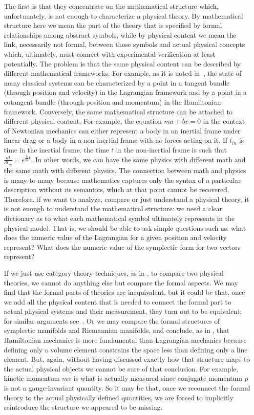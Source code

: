 \documentclass[11pt]{elsarticle}
\begin{document}
The first is that they concentrate on the mathematical structure which, unfortunately, is not enough to characterize a physical theory. By mathematical structure here we mean the part of the theory that is specified by formal relationships among abstract symbols, while by physical content we mean the link, necessarily not formal, between those symbols and actual physical concepts which, ultimately, must connect with experimental verification at least potentially. The problem is that the same physical content can be described by different mathematical frameworks. For example, as it is noted in~\cite{North,Curiel,Barrett1,Barrett2}, the state of many classical systems can be characterized by a point in a tangent bundle (through position and velocity) in the Lagrangian framework and by a point in a cotangent bundle (through position and momentum) in the Hamiltonian framework. Conversely, the same mathematical structure can be attached to different physical content. For example, the equation $ma + bv = 0$ in the context of Newtonian mechanics can either represent a body in an inertial frame under linear drag or a body in a non-inertial frame with no forces acting on it. If $t_{in}$ is time in the inertial frame, the time $t$ in the non-inertial frame is such that  $\frac{dt}{dt_{in}} = e^{\frac{b}{m}t}$. In other words, we can have the same physics with different math and the same math with different physics. The connection between math and physics is many-to-many because mathematics captures only the syntax of a particular description without its semantics, which at that point cannot be recovered. Therefore, if we want to analyze, compare or just understand a physical theory, it is not enough to understand the mathematical structure: we need a clear dictionary as to what each mathematical symbol ultimately represents in the physical model. That is, we should be able to ask simple questions such as: what does the numeric value of the Lagrangian for a given position and velocity represent? What does the numeric value of the symplectic form for two vectors represent?

If we just use category theory techniques, as in \cite{Barrett2}, to compare two physical theories, we cannot do anything else but compare the formal aspects. We may find that the formal parts of theories are inequivalent, but it could be that, once we add all the physical content that is needed to connect the formal part to actual physical systems and their measurement, they turn out to be equivalent; for similar arguments see~\cite{Coffey}. Or we may compare the formal structures of symplectic manifolds and Riemannian manifolds, and conclude, as in \cite{North}, that Hamiltonian mechanics is more fundamental than Lagrangian mechanics because defining only a volume element constrains the space less than defining only a line element. But, again, without having discussed exactly how that structure maps to the actual physical objects we cannot be sure of that conclusion. For example, kinetic momentum $mv$ is what is actually measured since conjugate momentum $p$ is not a gauge-invariant quantity. So it may be that, once we reconnect the formal theory to the actual physically defined quantities, we are forced to implicitly reintroduce the structure we appeared to be missing. 
\end{document}
